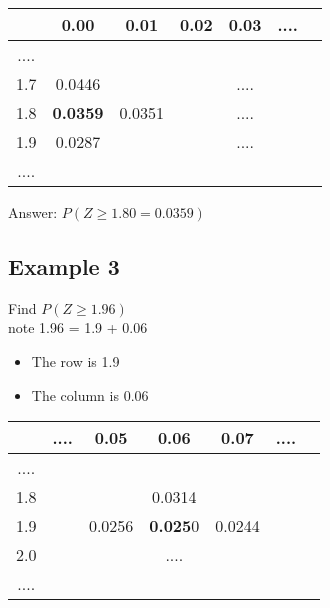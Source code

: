 {
\begin{table}[ht]


\centering %
\begin{tabular}{|c|| c c c c c c|} %
\hline
& 0.00& 0.01& 0.02& 0.03& ....&  \\ \hline
....&&& && & \\ \hline
1.7& 0.0446& & & ....& &\\ \hline
1.8& \textbf{0.0359}& 0.0351& & ....& & \\ \hline
1.9& 0.0287&&& ....& & \\ \hline
....&&&&& &\\ \hline
\hline %
\end{tabular}
\end{table}
}

\noindent Answer:  $P(Z \geq 1.80 = 0.0359)$





\subsection*{Example 3}  

Find  $P(Z \geq 1.96)$\\ 

note  1.96 = 1.9 + 0.06


\begin{itemize}
\item The row is 1.9
\item The column is 0.06
\end{itemize}


{
\begin{table}[ht]

\centering %
\begin{tabular}{|c|| c c c c c c|} %
\hline
&....&0.05&0.06&0.07&....& \\ \hline
....&&&&&  &   \\ \hline
1.8&&&0.0314&&&     \\ \hline
1.9&&0.0256&\textbf{0.025}0&0.0244&&     \\ \hline
2.0&&&....&& &   \\ \hline
....&&&&&&\\ \hline
\end{tabular}
\end{table}
}

